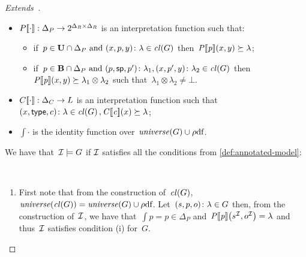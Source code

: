 \begin{proof}[Extends~\citep{MunozPerezGutierrez:2009aa}]
\begin{itemize}[nosep]
  \item ${P[\![\cdot]\!]}: \Delta_{P} \to 2^{\Delta_{R}\times\Delta_{R}}$ is an interpretation function such that:
    \begin{itemize}[nosep]
    \item if~$p \in \mathbf{U} \cap \Delta_{P}~\mathrm{and}~\mbox{$(x,p,y)\colon\lambda$} \in \mathit{cl}\!\left(G\right)$
      then~$\mathit{{P[\![p]\!]}}\!\left(x,y\right) \succeq \lambda$;
    \item if~$p \in \mathbf{B} \cap
      \Delta_{P}~\mathrm{and}~\mbox{$(p,\mathsf{sp},p')\colon\lambda_{1}$},\mbox{$(x,p',y)\colon\lambda_{2}$} \in
      \mathit{cl}\!\left(G\right)$ then~$\mathit{{P[\![p]\!]}}\!\left(x,y\right) \succeq \lambda_{1} \otimes \lambda_{2}$ such that~$\lambda_{1} \otimes
      \lambda_{2} \neq \bot$.
    \end{itemize}

  \item ${C[\![\cdot]\!]}: \Delta_{C} \to L$ is an interpretation function such that~$\mbox{$(x,\mathsf{type},c)\colon\lambda$}
    \in \mathit{cl}\!\left(G\right), \mathit{{C[\![c]\!]}}\!\left(x\right) \succeq \lambda$;

  \item $\int{\cdot}$ is the identity function over~$\mathit{\mathit{universe}}\!\left(G\right) \cup \mbox{$\rho$df}$.
  \end{itemize}
  We have that~$\mathcal{I} \models G$ if $\mathcal{I}$ satisfies all the conditions from \cref{def:annotated-model}:
  \begin{description}[nosep]
  \item[Simple:]~
    \begin{enumerate}[label=(\alph*),nosep]
    \item First note that from the construction of~$\mathit{cl}\!\left(G\right)$, $\mathit{\mathit{universe}}\!\left(\mathit{cl}\!\left(G\right)\right) = \mathit{\mathit{universe}}\!\left(G\right) \cup
      \mbox{$\rho$df}$.  
      Let~$\mbox{$(s,p,o)\colon\lambda$} \in G$ then, from the construction of~$\mathcal{I}$, we have that~$\int{p} = p \in
      \Delta_P$ and~$\mathit{{P[\![p]\!]}}\!\left({s}^{\mathcal{I}},{o}^{\mathcal{I}}\right) = \lambda$ and thus~$\mathcal{I}$ satisfies condition (i) for~$G$.


\end{enumerate}
\end{description}
\end{proof}
